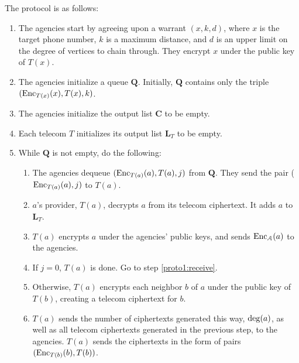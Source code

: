 The protocol is as follows:



\begin{enumerate}

\item The agencies start by agreeing upon a warrant $(x, k, d)$, where $x$ is the target phone number, $k$ is a maximum distance, and $d$ is an upper limit on the degree of vertices to chain through. They encrypt $x$ under the public key of $T(x)$.

\item The agencies initialize a queue $\mathbf{Q}$. Initially, $\mathbf{Q}$ contains only the triple $(\operatorname{Enc}_{T(x)}(x), T(x), k)$.

\item The agencies initialize the output list $\mathbf{C}$ to be empty.

\item Each telecom $T$ initializes its output list $\mathbf{L}_T$ to be empty.

\item While $\mathbf{Q}$ is not empty, do the following:

\begin{enumerate}

\item \label{proto1:top-of-loop} The agencies dequeue $(\operatorname{Enc}_{T(a)}(a), T(a), j)$ from $\mathbf{Q}$. They send the pair ($\operatorname{Enc}_{T(a)}(a), j)$ to $T(a)$.

\item $a$'s provider, $T(a)$, decrypts $a$ from its telecom ciphertext. It adds $a$ to $\mathbf{L}_T$.

\item \label{proto1:first-send} $T(a)$ encrypts $a$ under the agencies' public keys, and sends $\operatorname{Enc}_\mathcal{A}(a)$ to the agencies.

\item If $j=0$, $T(a)$ is done. Go to step \ref{proto1:receive}.

\item Otherwise, $T(a)$ encrypts each neighbor $b$ of $a$ under the public key of $T(b)$, creating a telecom ciphertext for $b$.

\item \label{proto1:second-send} $T(a)$ sends the number of ciphertexts generated this way, $\operatorname{deg}(a)$, as well as all telecom ciphertexts generated in the previous step, to the agencies. $T(a)$ sends the ciphertexts in the form of pairs $(\operatorname{Enc}_{T(b)}(b), T(b))$.


\end{enumerate}
\end{enumerate}
